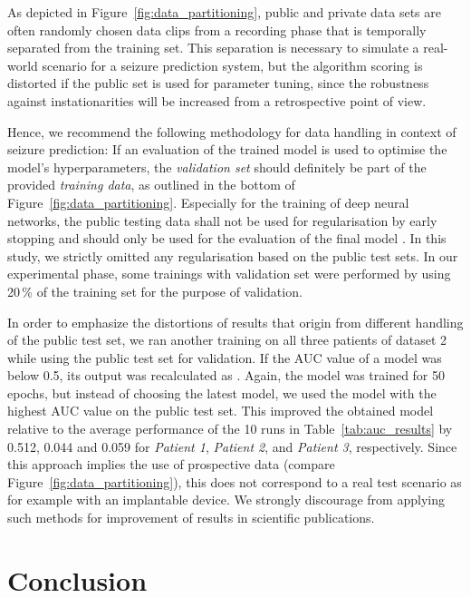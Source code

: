\documentclass[a4paper, conference]{IEEEtran}
\begin{document}
As depicted in Figure~\ref{fig:data_partitioning}, public and private data sets are often randomly chosen data clips from a recording phase that is temporally separated from the training set. This separation is necessary to simulate a real-world scenario for a seizure prediction system, but the algorithm scoring is distorted if the public set is used for parameter tuning, since the robustness against instationarities will be increased from a retrospective point of view.

Hence, we recommend the following methodology for data handling in context of seizure prediction: If an evaluation of the trained model is used to optimise the model's hyperparameters, the \textit{validation set} should definitely be part of the provided \textit{training data}, as outlined in the bottom of Figure~\ref{fig:data_partitioning}. Especially for the training of deep neural networks, the public testing data shall not be used for regularisation by early stopping and should only be used for the evaluation of the final model \cite{Korshunova2018}. In this study, we strictly omitted any regularisation based on the public test sets. In our experimental phase, some trainings with validation set were performed by using 20\,\% of the training set for the purpose of validation. 

In order to emphasize the distortions of results that origin from different handling of the public test set, we ran another training on all three patients of dataset 2 while using the public test set for validation. If the AUC value of a model was below 0.5, its output  was recalculated as . Again, the model was trained for 50 epochs, but instead of choosing the latest model, we used the model with the highest AUC value on the public test set. This improved the obtained model relative to the average performance of the 10 runs in Table~\ref{tab:auc_results} by 0.512, 0.044 and 0.059 for \textit{Patient 1}, \textit{Patient 2}, and \textit{Patient 3}, respectively. Since this approach implies the use of prospective data (compare Figure~\ref{fig:data_partitioning}), this does not correspond to a real test scenario as for example with an implantable device. We strongly discourage from applying such methods for improvement of results in scientific publications.


\section{Conclusion}
\label{sec:conclusion}
\end{document}
